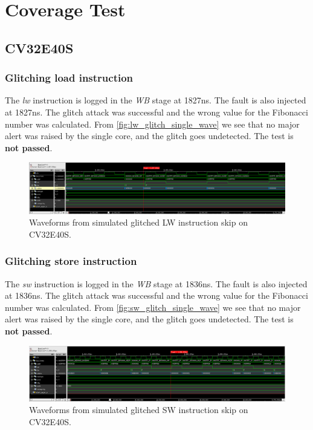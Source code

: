 \section{Coverage Test}
\label{sec:cov_test_result}

\subsection{CV32E40S}

\subsubsection{Glitching load instruction}

The \textit{lw} instruction is logged in the \textit{WB} stage at 1827ns. The fault is also injected at 1827ns. The glitch attack was successful and the wrong value for the Fibonacci number was calculated. From \autoref{fig:lw_glitch_single_wave} we see that no major alert was raised by the single core, and the glitch goes undetected. The test is \textbf{not passed}.

\begin{figure}[h!]
    \centering
    \includegraphics[width=\textwidth]{docs/images/lw_glitch_single_core.png}
    \caption{Waveforms from simulated glitched LW instruction skip on CV32E40S.}
    \label{fig:lw_glitch_single_wave}
\end{figure}

\subsubsection{Glitching store instruction}

The \textit{sw} instruction is logged in the \textit{WB} stage at 1836ns. The fault is also injected at 1836ns. The glitch attack was successful and the wrong value for the Fibonacci number was calculated. From \autoref{fig:sw_glitch_single_wave} we see that no major alert was raised by the single core, and the glitch goes undetected. The test is \textbf{not passed}.

\begin{figure}[h!]
    \centering
    \includegraphics[width=\textwidth]{docs/images/sw_glitch_single_core.png}
    \caption{Waveforms from simulated glitched SW instruction skip on CV32E40S.}
    \label{fig:sw_glitch_single_wave}
\end{figure}


